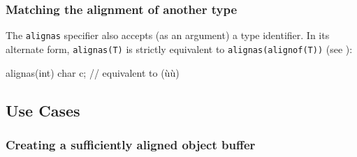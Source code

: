 \subsubsection[Matching the alignment of another type]{Matching the alignment of another type}\label{matching-the-alignment-of-another-type}

The \lstinline!alignas! specifier also accepts (as an argument) a type
identifier. In its alternate form, \lstinline!alignas(T)! is strictly
equivalent to \lstinline!alignas(alignof(T))! (see ):

\begin{emcppslisting}
alignas(int) char c;  // equivalent to (ù{}ù)
\end{emcppslisting}


\subsection[Use Cases]{Use Cases}\label{alignas-use-cases}

\subsubsection[Creating a sufficiently aligned object buffer]{Creating a sufficiently aligned object buffer}\label{creating-a-sufficiently-aligned-object-buffer}


